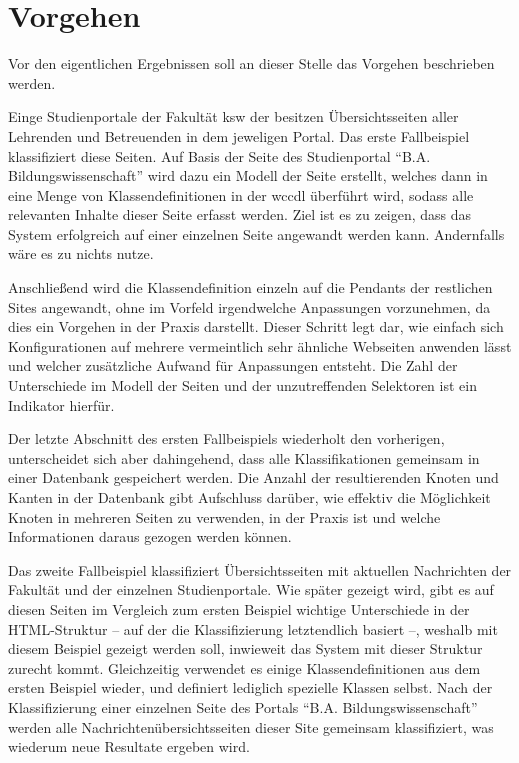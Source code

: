 \section{Vorgehen}
    \label{section:findingsMethod}
    Vor den eigentlichen Ergebnissen soll an dieser Stelle
    das Vorgehen beschrieben werden.

    Einge Studienportale der Fakultät \gls{ksw} der {\fernUni}
    besitzen Übersichtsseiten aller Lehrenden und Betreuenden
    in dem jeweligen Portal.
    Das erste Fallbeispiel klassifiziert diese Seiten.
    Auf Basis der Seite des Studienportal "`B.A. Bildungswissenschaft"'
    wird dazu ein Modell der Seite erstellt,
    welches dann in eine Menge von Klassendefinitionen in der \gls{wccdl} überführt wird,
    sodass alle relevanten Inhalte dieser Seite erfasst werden.
    Ziel ist es zu zeigen, dass das System erfolgreich auf einer einzelnen Seite angewandt werden kann.
    Andernfalls wäre es zu nichts nutze.

    Anschließend wird die Klassendefinition einzeln auf die Pendants der restlichen Sites angewandt,
    ohne im Vorfeld irgendwelche Anpassungen vorzunehmen,
    da dies ein Vorgehen in der Praxis darstellt.
    Dieser Schritt legt dar, wie einfach sich Konfigurationen auf mehrere vermeintlich
    sehr ähnliche Webseiten anwenden lässt und welcher zusätzliche Aufwand für Anpassungen entsteht.
    Die Zahl der Unterschiede im Modell der Seiten und der unzutreffenden Selektoren ist ein Indikator hierfür.

    Der letzte Abschnitt des ersten Fallbeispiels wiederholt den vorherigen,
    unterscheidet sich aber dahingehend, dass alle Klassifikationen
    gemeinsam in einer Datenbank gespeichert werden.
    Die Anzahl der resultierenden Knoten und Kanten in der Datenbank
    gibt Aufschluss darüber, wie effektiv die Möglichkeit Knoten in mehreren Seiten
    zu verwenden, in der Praxis ist und welche Informationen daraus gezogen werden können.

    Das zweite Fallbeispiel klassifiziert Übersichtsseiten mit aktuellen Nachrichten
    der Fakultät und der einzelnen Studienportale.
    Wie später gezeigt wird, gibt es auf diesen Seiten im Vergleich zum ersten Beispiel
    wichtige Unterschiede in der HTML-Struktur -- auf der die Klassifizierung letztendlich basiert --,
    weshalb mit diesem Beispiel gezeigt werden soll, inwieweit das System mit dieser Struktur zurecht kommt.
    Gleichzeitig verwendet es einige Klassendefinitionen aus dem ersten Beispiel wieder,
    und definiert lediglich spezielle Klassen selbst.
    Nach der Klassifizierung einer einzelnen Seite des Portals "`B.A. Bildungswissenschaft"'
    werden alle Nachrichtenübersichtsseiten dieser Site gemeinsam klassifiziert,
    was wiederum neue Resultate ergeben wird.

